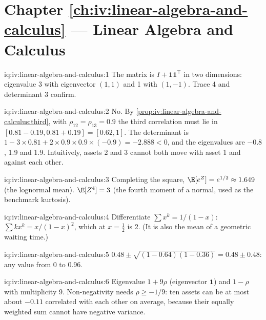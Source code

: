 \section*{Chapter \ref{ch:iv:linear-algebra-and-calculus} --- Linear Algebra and Calculus}

\begin{solution}{iq:iv:linear-algebra-and-calculus:1}
The matrix is $I + \mathbf 1\mathbf 1^\top$ in two dimensions: eigenvalue 3 with eigenvector $(1, 1)$ and 1 with $(1,
-1)$. Trace 4 and determinant 3 confirm.
\end{solution}

\begin{solution}{iq:iv:linear-algebra-and-calculus:2}
No. By \cref{prop:iv:linear-algebra-and-calculus:third}, with $\rho_{12} = \rho_{13} = 0.9$ the third correlation
must lie in $[0.81 - 0.19, 0.81 + 0.19] = [0.62, 1]$. The determinant is $1 - 3 \times 0.81 + 2 \times 0.9 \times 0.9
\times (-0.9) = -2.888 < 0$, and the eigenvalues are $-0.8$, 1.9 and 1.9. Intuitively, assets 2 and 3 cannot both
move with asset 1 and against each other.
\end{solution}

\begin{solution}{iq:iv:linear-algebra-and-calculus:3}
Completing the square, $\E[e^Z] = e^{1/2} \approx 1.649$ (the lognormal mean). $\E[Z^4] = 3$ (the fourth moment of a
normal, used as the benchmark kurtosis).
\end{solution}

\begin{solution}{iq:iv:linear-algebra-and-calculus:4}
Differentiate $\sum x^k = 1/(1-x)$: $\sum kx^k = x/(1-x)^2$, which at $x = \tfrac12$ is 2. (It is also the mean of
a geometric waiting time.)
\end{solution}

\begin{solution}{iq:iv:linear-algebra-and-calculus:5}
$0.48 \pm \sqrt{(1 - 0.64)(1 - 0.36)} = 0.48 \pm 0.48$: any value from 0 to 0.96.
\end{solution}

\begin{solution}{iq:iv:linear-algebra-and-calculus:6}
Eigenvalue $1 + 9\rho$ (eigenvector $\mathbf 1$) and $1 - \rho$ with multiplicity 9. Non-negativity needs $\rho \ge
-1/9$: ten assets can be at most about $-0.11$ correlated with each other on average, because their equally weighted sum
cannot have negative variance.
\end{solution}

